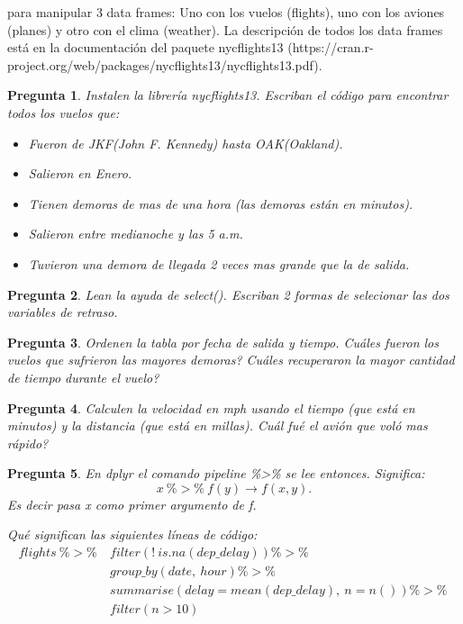 \documentclass[12pt]{article}
\newtheorem{pregunta}{Pregunta}
\begin{document}
para manipular 3 data frames: Uno con los vuelos (flights), uno con los aviones (planes) y otro con el clima (weather). La descripción de todos los data frames está en la documentación del paquete nycflights13 (https://cran.r-project.org/web/packages/nycflights13/nycflights13.pdf).
\begin{pregunta}
Instalen la librería nycflights13.
Escriban el código para encontrar todos los vuelos que:
\begin{itemize}
\item Fueron de JKF(John F. Kennedy) hasta OAK(Oakland).
\item Salieron en Enero.
\item Tienen demoras de mas de una hora (las demoras están en minutos).
\item Salieron entre medianoche y las 5 a.m.
\item Tuvieron una demora de llegada 2 veces mas grande que la de salida.
\end{itemize}
\end{pregunta}
\begin{pregunta}
Lean la ayuda de select(). Escriban 2 formas de selecionar las dos variables de retraso.
\end{pregunta}
\begin{pregunta}
Ordenen la tabla por fecha de salida y tiempo. Cu\'ales fueron los vuelos que sufrieron las mayores demoras? Cuáles recuperaron la mayor cantidad de tiempo durante el vuelo?
\end{pregunta}
\begin{pregunta}
Calculen la velocidad en mph usando el tiempo (que est\'a en minutos) y la distancia (que est\'a en millas). Cu\'al fué el avión que voló mas rápido?
\end{pregunta}
\begin{pregunta}
En dplyr el comando pipeline \%>\% se lee entonces. Significa:
\begin{equation*}
x \ \%>\% \ f(y) \longrightarrow f(x, y).
\end{equation*}
Es decir pasa x como primer argumento de f.
\par
Qué significan las siguientes líneas de código:
\begin{align*}
  flights\ \%>\% \ & filter(! \ is.na(dep\_delay))  \%>\%\ \\
          & group\_by(date, \ hour) \%>\%\ \\
          & summarise(delay = mean(dep\_delay), \ n = n()) \%>\%\ \\
          & filter(n > 10)
\end{align*}
\end{pregunta}
\end{document}
